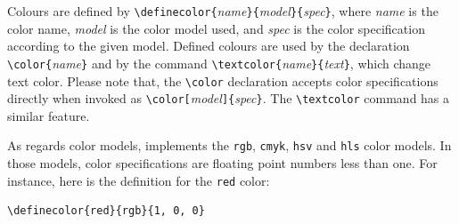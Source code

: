 %
Colours are defined by
\verb+\definecolor{+\textit{name}\verb+}{+\textit{model}\verb+}{+\textit{spec}\verb+}+,
where \textit{name} is the color name, \textit{model} is the color
model used, and \textit{spec} is the color specification according to
the given model.
Defined colours are used by the declaration
\verb+\color{+\textit{name}\verb+}+ and by the command
\verb+\textcolor{+\textit{name}\verb+}{+\textit{text}\verb+}+, which
change text color.
Please note that, the \verb+\color+ declaration
accepts color specifications directly
when invoked as
\verb+\color[+\textit{model}\verb+]{+\textit{spec}\verb+}+.
The \verb+\textcolor+ command has a similar feature.


As regards color models, \hevea{} implements the \texttt{rgb},
\texttt{cmyk}, \texttt{hsv} and \texttt{hls} color models.
In those models, color specifications are floating point numbers less
than one.
For instance, here is the definition for the \texttt{red} color:
\begin{verbatim}
\definecolor{red}{rgb}{1, 0, 0}
\end{verbatim}


